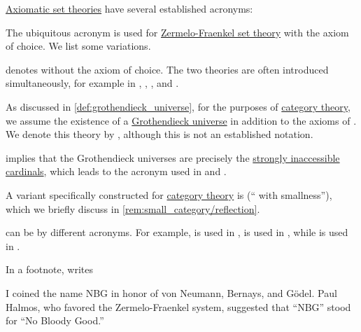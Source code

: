 \begin{remark}\label{rem:set_theory_acronyms}
  \hyperref[def:axiomatic_set_theory]{Axiomatic set theories} have several established acronyms:
  \begin{thmenum}
     The ubiquitous acronym  is used for \hyperref[def:zfc]{Zermelo-Fraenkel set theory} with the axiom of choice. We list some variations.
    \begin{itemize}
        denotes  without the axiom of choice. The two theories are often introduced simultaneously, for example in
      \cite[510]{Hinman2005Logic},
      \cite[3]{Jech2006SetTheory},
      \cite[17]{Kunen2013SetTheory},
      \cite[253]{Shoenfield1967MathematicalLogic} and
      \cite[161]{КолмогоровДрагалин2006ЛогикаДополнительныеГлавы}.

       As discussed in \cref{def:grothendieck_universe}, for the purposes of \hyperref[ch:category_theory]{category theory}, we assume the existence of a \hyperref[def:grothendieck_universe]{Grothendieck universe} in addition to the axioms of . We denote this theory by \hyperref[def:axiom_of_universes]{}, although this is not an established notation.

       implies that the Grothendieck universes are precisely the \hyperref[rem:strongly_inaccessible_cardinal]{strongly inaccessible cardinals}, which leads to the acronym  used in \cite[167]{Jech2006SetTheory} and \cite[16]{Shulman2008SetTheoryForCategoryTheory}.

       A variant specifically constructed for \hyperref[ch:category_theory]{category theory} is  (\enquote{ with smallness}), which we briefly discuss in \cref{rem:small_category/reflection}.
    \end{itemize}

      can be by different acronyms. For example,  is used in \cite[70]{Jech2006SetTheory},  is used in \cite[232]{Mendelson2015Logic}, while  is used in \cite[151]{Kunen2013SetTheory}.

    In a footnote, \textcite[231]{Mendelson2015Logic} writes
    \begin{displayquote}
      I coined the name NBG in honor of von Neumann, Bernays, and G\"odel. Paul Halmos, who favored the Zermelo-Fraenkel system, suggested that \enquote{NBG} stood for \enquote{No Bloody Good.}
    \end{displayquote}


\end{thmenum}
\end{remark}
